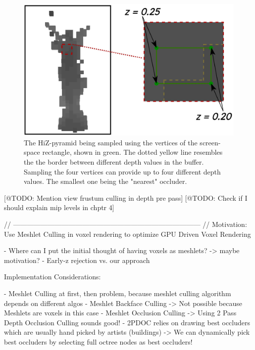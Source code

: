 \begin{figure}[h]
    \centering
    \includegraphics[width=\linewidth]{images/graphics/visibility-hiz-sampling.jpg}
    \caption{The \ac{HiZ}-pyramid being sampled using the vertices of the screen-space rectangle, shown in green. 
    The dotted yellow line resembles the the border between different depth values in the buffer. Sampling the four 
    vertices can provide up to four different depth values. The smallest one being the "nearest" occluder.}
    \label{fig:visibility-hiz-sampling}
\end{figure}







[@TODO: Mention view frustum culling in depth pre pass]
[@TODO: Check if I should explain mip levels in chptr 4]


// --------------------------------------------------------------------------------- //
Motivation:
Use Meshlet Culling in voxel rendering to optimize GPU Driven Voxel Rendering

- Where can I put the initial thought of having voxels as meshlets? -> maybe motivation? 
- Early-z rejection vs. our approach

Implementation Considerations:

- Meshlet Culling at first, then problem, because meshlet culling algorithm depends on different algos
    - Meshlet Backface Culling -> Not possible because Meshlets are voxels in this case
    - Meshlet Occlusion Culling -> Using 2 Pass Depth Occlusion Culling sounds good!
    - 2PDOC relies on drawing best occluders which are usually hand picked by artists (buildings)
        -> We can dynamically pick best occluders by selecting full octree nodes as best occluders!

